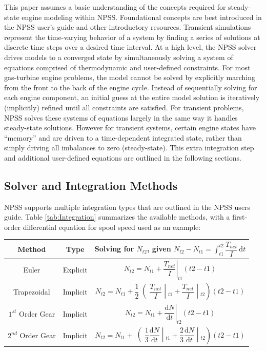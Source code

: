 \documentclass[heading.tex]{subfiles}
\begin{document}
This paper assumes a basic understanding of the concepts required for steady-state engine modeling within NPSS.
Foundational concepts are best introduced in the NPSS user's guide \cite{NPSS} and other introductory resources.
\cite{JonesIntro}
Transient simulations represent the time-varying behavior of a system by finding
a series of solutions at discrete time steps over a desired time interval.
At a high level, the NPSS solver drives models to a converged state
by simultaneously solving a system of equations comprised of thermodynamic and
user-defined constraints. For most gas-turbine engine problems,
the model cannot be solved by explicitly marching from the front to the back of
the engine cycle. Instead of sequentially solving for each engine component,
an initial guess at the entire model solution is iteratively (implicitly) refined
until all constraints are satisfied. 
For transient problems, NPSS solves these systems of
equations largely in the same way it handles steady-state solutions.
However for transient systems, certain engine states have ``memory''
and are driven to a time-dependent integrated state,
rather than simply driving all imbalances to zero (steady-state).
This extra integration step and additional user-defined equations are
outlined in the following sections.

\subsection{Solver and Integration Methods}
NPSS supports multiple integration types that are outlined in the NPSS users guide.
\cite[chap.~7.1]{NPSS} Table \ref{tab:Integration} summarizes the available methods, with a 
first-order differential equation for spool speed used as an example: 

\begin{minipage}{\linewidth}
\centering
\bigskip
{} \label{tab:Integration}
\begin{tabular}{|c|c|c|}
\hline 
Method & Type & Solving for  $N_{t2}$, given  $N_{t2}- N_{t1}= \int_{t1}^{t2} \! \dfrac{T_{net}}{I} \, \mathrm{d}t $\\ 
\hline 
Euler & Explicit & $ \left.N_{t2}= N_{t1} + \dfrac{T_{net}}{I} \right|_{t1}^{}(t2-t1)$ \\ 
\hline 
Trapezoidal & Implicit & $ \left.N_{t2}= N_{t1} + \dfrac{1}{2}\middle(\dfrac{T_{net}}{I} \middle|_{t1}^{}+\dfrac{T_{net}}{I} \middle|_{t2}^{}\right)(t2-t1)$ \\ 
\hline 
$1^{st}$ Order Gear & Implicit & $ \left.N_{t2}= N_{t1} + \dfrac{ \mathrm{d}N }{ \mathrm{d}t } \right|_{t2}^{}(t2-t1)$ \\ 
\hline 
$2^{nd}$ Order Gear & Implicit & $ \left.N_{t2}= N_{t1} + \middle(\dfrac{1}{3}\dfrac{ \mathrm{d}N }{ \mathrm{d}t }\middle|_{t1}^{}+\dfrac{2}{3}\dfrac{ \mathrm{d}N }{ \mathrm{d}t }\middle|_{t2}^{}\right)(t2-t1)$ \\ 
\hline 
\end{tabular} 
\end{minipage}
\end{document}
